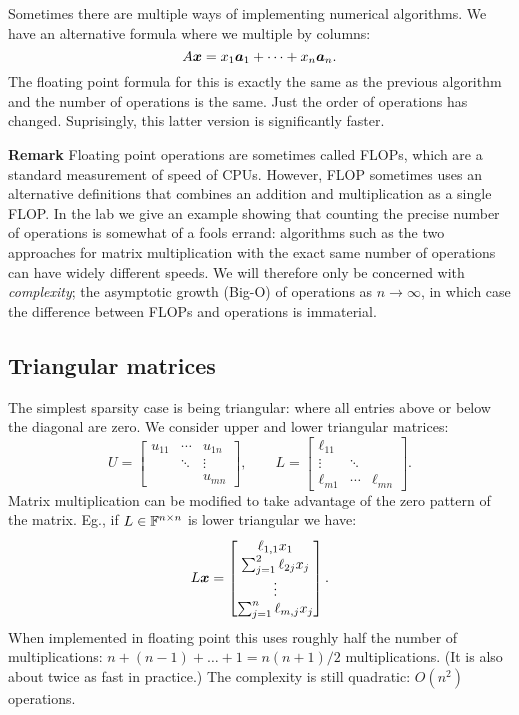 Sometimes there are multiple ways of implementing numerical algorithms. We have an alternative formula where we multiple by columns:
\[
A \bm{{\mbox{\boldmath$x$\unboldmath}}} = x_1 \bm{{\mbox{\boldmath$a$\unboldmath}}}_1  + \cdots + x_n \bm{{\mbox{\boldmath$a$\unboldmath}}}_n.
\]
The floating point formula for this is exactly the same as the previous algorithm and the number of operations is the same. Just the order of operations has changed. Suprisingly, this latter version is significantly faster.

\textbf{Remark} Floating point operations are sometimes called FLOPs, which are a standard measurement  of speed of CPUs. However, FLOP sometimes uses an alternative definitions that combines an addition and multiplication as a single FLOP. In the lab we give an example showing that counting the precise number of operations is somewhat of a fools errand: algorithms such as the two approaches for matrix multiplication with the exact same number of operations can have widely different speeds. We will therefore only be concerned with \emph{complexity}; the asymptotic growth (Big-O) of operations as $n \ensuremath{\rightarrow} \ensuremath{\infty}$, in which case the difference between FLOPs and operations is immaterial.

\subsection{Triangular matrices}
The simplest sparsity case is being triangular: where all entries above or below the diagonal are zero. We consider upper and lower triangular matrices:
\[
U = \begin{bmatrix}
u_{11} & \ensuremath{\cdots} & u_{1n} \\
 & \ensuremath{\ddots} & \ensuremath{\vdots} \\
 &  & u_{mn}
\end{bmatrix}, \qquad L = \begin{bmatrix}
\ensuremath{\ell}_{11} &  \\
\ensuremath{\vdots} & \ensuremath{\ddots} & \\
\ensuremath{\ell}_{m1} & \ensuremath{\cdots} & \ensuremath{\ell}_{mn}
\end{bmatrix}.
\]
Matrix multiplication can be modified to take advantage of the zero pattern of the matrix. Eg., if $L \in {\mathbb F}^{n \times n}$ is lower triangular we have:
\[
L\bm{{\mbox{\boldmath$x$\unboldmath}}} = \begin{bmatrix} \ell_{1,1} x_1 \\ \sum_{j=1}^2 \ell_{2j} x_j  \\ \vdots \\ \sum_{j=1}^n \ell_{m,j} x_j \end{bmatrix}.
\]
When implemented in floating point this uses roughly half the number of multiplications: $n + (n-1) + \ensuremath{\ldots} + 1 = n(n+1)/2$ multiplications. (It is also about twice as fast in practice.) The complexity is still quadratic: $O(n^2)$ operations.

